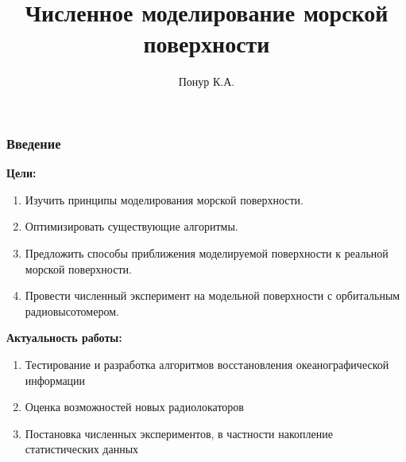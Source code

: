 \documentclass[10pt,pdf,hyperref={unicode}, dvipsnames]{beamer}
\begin{document}
\title[Моделирование морской поверхности]{Численное моделирование морской поверхности}

\author{Понур К.А.}




\begin{frame}[t]
	\frametitle{Введение}
	\vfill
	\textbf{Цели: }\\
		\begin{enumerate}
			\item Изучить принципы моделирования морской поверхности.

			\item Оптимизировать существующие алгоритмы.

            \item Предложить способы приближения моделируемой поверхности к
                реальной морской поверхности.
            \item Провести численный эксперимент на модельной поверхности с
                орбитальным радиовысотомером.
		\end{enumerate}
		\vfill

	\textbf{Актуальность работы: }

	\begin{enumerate}
		\item Тестирование и разработка алгоритмов восстановления океанографической информации
		\item Оценка возможностей новых радиолокаторов
		\item Постановка численных экспериментов, в частности накопление статистических данных
	\end{enumerate}
	\vfill
\end{frame}
\end{document}
